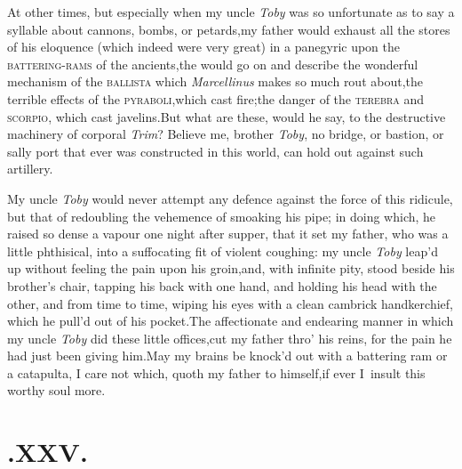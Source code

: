 \documentclass{article}
\begin{document}
At other times, but especially when my uncle \textit{Toby} was so
unfortunate as to say a syllable about cannons, bombs, or
petards,\tsk my father would exhaust all the stores of his
eloquence (which indeed were very great) in a panegyric upon
the
\textsc{battering-rams} of the ancients,\tsk the 
would go on and
describe the wonderful mechanism of the \textsc{ballista} which
\textit{Mar\-cellinus} makes so much rout about,\tsk the terrible
effects of the \textsc{pyraboli},\tsk which cast fire;\tsk the
danger of the \textsc{terebra} and \textsc{scorpio}, which cast
javelins.\tsh But what are these, would he say, to the
destructive machinery of corporal \textit{Trim}?\tsk
Believe me, brother \textit{Toby}, no bridge, or bastion, or
sally port that ever was constructed in this world, can hold
out against
such artillery.

My uncle \textit{Toby} would never attempt
any defence against the force of this ridi\-cule, but that of
redoubling the vehemence of smoaking his pipe; in doing which,
he raised so dense a vapour one night after supper, that it set
my father, who was a little phthisical, into a suffocating fit
of violent coughing: my uncle \textit{Toby} leap’d up without
feeling the pain upon his groin,\tsk and, with infinite pity,
stood beside his brother’s chair, tapping his back with one
hand, and holding his head with the other, and from time to time,
wiping his eyes with a clean cambrick handkerchief, which he
pull’d out of his pocket.\tsh The affectionate and endearing
manner in which my uncle \textit{Toby} did these little
offices,\tsk cut my father thro’ his reins, for the pain he had
just been giving him.\tsh May my brains be knock’d out with a
battering ram or a catapulta, I care not which,
quoth my father to himself,\tsh if ever I~insult this worthy
soul more.

\section{.\quad  XXV.}
\end{document}
